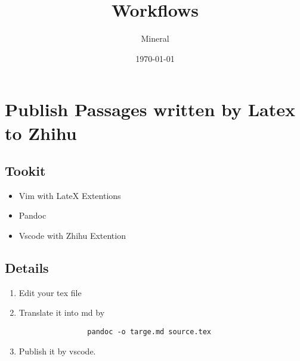\documentclass[utf8]{ctexart}
\author{Mineral}
\title{Workflows}
\date {\today}
\begin{document}
		\maketitle
		\section{Publish Passages written by Latex to Zhihu}
		\subsection{Tookit}
		\begin{itemize}
				\item Vim with LateX Extentions
				\item Pandoc
				\item Vscode with Zhihu Extention
		\end{itemize}
		\subsection{Details}
		\begin{enumerate}
				\item Edit your tex file 
				\item Translate it into md by 
				\begin{verbatim}
				pandoc -o targe.md source.tex
				\end{verbatim} 
				\item Publish it by vscode.
		\end{enumerate}
		
		
		
\end{document}

